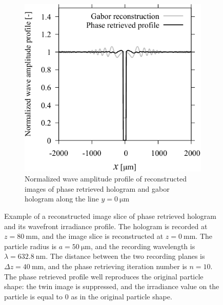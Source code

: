 \begin{figure}[htbp]
\begin{subfigure}[t]{0.48\linewidth}
        \includegraphics[width=\linewidth]{./Figure/2_Theory/PR_twin_image/prprofile.pdf}
        \caption{Normalized wave amplitude profile of reconstructed images of phase retrieved hologram and gabor hologram along the line $y=\SI{0}{\um}$ }
        \label{fig:twinImagePR:profile}
    \end{subfigure}

    \caption{Example of a reconstructed image slice of phase retrieved hologram and its wavefront irradiance profile. The hologram is recorded at $z=\SI{80}{\mm}$, and the image slice is reconstructed at $z=\SI{0}{\mm}$. The particle radius is $a=\SI{50}{\um}$, and the recording wavelength is $\lambda = \SI{632.8}{\nm}$. The distance between the two recording planes is $\Delta z = \SI{40}{\mm}$, and the phase retrieving iteration number is $n=10$. The phase retrieved profile well reproduces the original particle shape: the twin image is suppressed, and the irradiance value on the particle is equal to 0 as in the original particle shape.}
    \label{fig:twinImagePR}
\end{figure}


